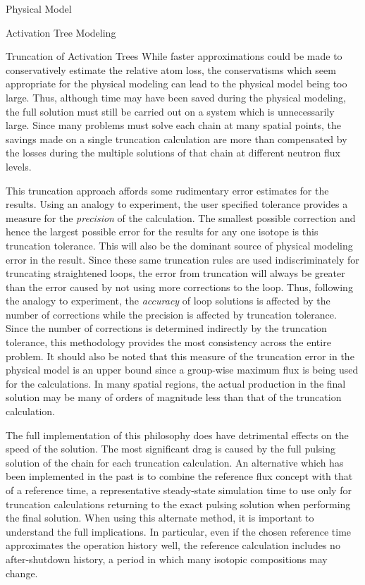 \begin{chapter}{Physical Model\label{chap:physical}}
\begin{section}{Activation Tree Modeling\label{sec:physical.chains}}
\begin{subsection}{Truncation of Activation Trees}
    While faster approximations could be made to conservatively
    estimate the relative atom loss, the conservatisms which seem
    appropriate for the physical modeling can lead to the physical
    model being too large.  Thus, although time may have been saved
    during the physical modeling, the full solution must still be
    carried out on a system which is unnecessarily large.  Since many
    problems must solve each chain at many spatial points, the savings
    made on a single truncation calculation are more than compensated
    by the losses during the multiple solutions of that chain at
    different neutron flux levels.
    
    This truncation approach affords some rudimentary error estimates
    for the results.  Using an analogy to experiment, the user
    specified tolerance provides a measure for the \textsl{precision}
    of the calculation.  The smallest possible correction and hence
    the largest possible error for the results for any one isotope is
    this truncation tolerance.  This will also be the dominant source
    of physical modeling error in the result.  Since these same
    truncation rules are used indiscriminately for truncating
    straightened loops, the error from truncation will always be
    greater than the error caused by not using more corrections to the
    loop.  Thus, following the analogy to experiment, the
    \textsl{accuracy} of loop solutions is affected by the number of
    corrections while the precision is affected by truncation
    tolerance.  Since the number of corrections is determined
    indirectly by the truncation tolerance, this methodology provides
    the most consistency across the entire problem.  It should also be
    noted that this measure of the truncation error in the physical
    model is an upper bound since a group-wise maximum flux is being
    used for the calculations.  In many spatial regions, the actual
    production in the final solution may be many of orders of
    magnitude less than that of the truncation calculation.
    
    The full implementation of this philosophy does have detrimental
    effects on the speed of the solution.  The most significant drag
    is caused by the full pulsing solution of the chain for each
    truncation calculation.  An alternative which has been implemented
    in the past is to combine the reference flux concept with that of
    a reference time, a representative steady-state simulation time to
    use only for truncation calculations returning to the exact
    pulsing solution when performing the final solution.  When using
    this alternate method, it is important to understand the full
    implications.  In particular, even if the chosen reference time
    approximates the operation history well, the reference calculation
    includes no after-shutdown history, a period in which many
    isotopic compositions may change.
    

\end{subsection}
\end{section}
\end{chapter}
